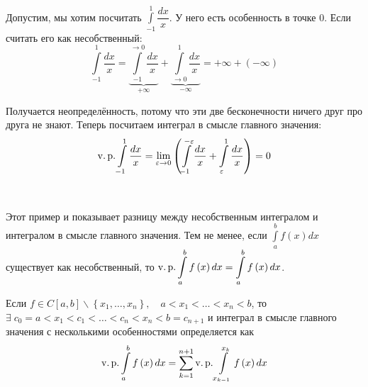 \documentclass[../main.tex]{subfiles}
\begin{document}
\begin{example}
    
    ~

    Допустим, мы хотим посчитать \( \displaystyle\int\limits_{ -1}^{ 1} \dfrac{ dx}{ x} \). У него есть особенность в точке 0. Если считать его как несобственный:
    \[ \displaystyle\int\limits_{ -1}^{ 1} \dfrac{ dx}{ x} = \underbrace{\displaystyle\int\limits_{ -1}^{ \rightarrow 0} \dfrac{ dx}{ x}}_{+ \infty } + \underbrace{\displaystyle\int\limits_{ \rightarrow 0}^{ 1} \dfrac{ dx}{ x}}_{- \infty }= + \infty + (- \infty ) \]

    Получается неопределённость, потому что эти две бесконечности ничего друг про друга не знают. Теперь посчитаем интеграл в смысле главного значения: 
    \[ \operatorname{v.p.} \displaystyle\int\limits_{ -1}^{ 1} \dfrac{ dx}{ x} = \lim\limits_{ \varepsilon \rightarrow 0} \left( \displaystyle\int\limits_{ -1}^{ -\varepsilon } \dfrac{ dx}{ x}  + \displaystyle\int\limits_{ \varepsilon }^{ 1} \dfrac{ dx}{ x}  \right)=0\]
\end{example}

\begin{note}
    
    ~

    Этот пример и показывает разницу между несобственным интегралом и интегралом в смысле главного значения. Тем не менее, если \( \displaystyle\int\limits_{ a}^{ b}f\left( x\right)dx \) существует как несобственный, то 
    \( \operatorname{v.p.} \displaystyle\int\limits_{ a}^{ b} f\left( x\right)dx= \displaystyle\int\limits_{ a}^{ b} f\left( x\right)dx\).
\end{note}

Если \( f \in C\left[ a,b\right] \backslash \left\{ x_1, \ldots , x_n\right\},\quad a<x_1< \ldots <x_n<b\), то \( \exists \; c_0=a<x_1<c_1< \ldots <c_n<x_n<b=c_{n+1}\) и интеграл в смысле главного значения с несколькими особенностями определяется как 
\[ \operatorname{v.p.} \displaystyle\int\limits_{ a}^{ b} f\left( x\right)dx= \sum\limits_{ k=1}^{ n+1} \operatorname{v.p.} \displaystyle\int\limits_{ x_{k-1}}^{ x_k} f\left( x\right)dx\]
\end{document}
